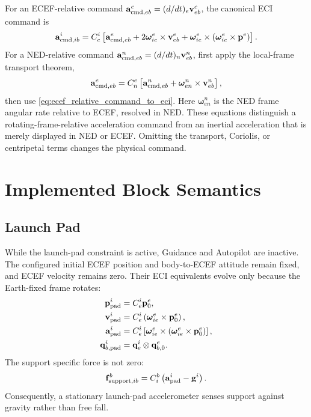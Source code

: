 For an ECEF-relative command
$\mathbf{a}_{\mathrm{cmd},eb}^{e}=(d/dt)_e\mathbf{v}_{eb}^{e}$, the canonical ECI command is
\begin{equation}
\mathbf{a}_{\mathrm{cmd},ib}^{i}
=
C_e^i
\left[
\mathbf{a}_{\mathrm{cmd},eb}^{e}
+2\boldsymbol{\omega}_{ie}^{e}\times\mathbf{v}_{eb}^{e}
+\boldsymbol{\omega}_{ie}^{e}\times
 \left(
 \boldsymbol{\omega}_{ie}^{e}\times\mathbf{p}^{e}
 \right)
\right].
\label{eq:ecef_relative_command_to_eci}
\end{equation}
For a NED-relative command
$\mathbf{a}_{\mathrm{cmd},eb}^{n}=(d/dt)_n\mathbf{v}_{eb}^{n}$, first apply the local-frame
transport theorem,
\begin{equation}
\mathbf{a}_{\mathrm{cmd},eb}^{e}
=
C_n^e
\left[
\mathbf{a}_{\mathrm{cmd},eb}^{n}
+\boldsymbol{\omega}_{en}^{n}\times\mathbf{v}_{eb}^{n}
\right],
\label{eq:ned_relative_command_to_ecef}
\end{equation}
then use \cref{eq:ecef_relative_command_to_eci}. Here
$\boldsymbol{\omega}_{en}^{n}$ is the NED frame angular rate relative to ECEF,
resolved in NED. These equations distinguish a rotating-frame-relative
acceleration command from an inertial acceleration that is merely displayed
in NED or ECEF. Omitting the transport, Coriolis, or centripetal terms changes
the physical command.

\section{Implemented Block Semantics}

\subsection{Launch Pad}

While the launch-pad constraint is active, Guidance and Autopilot are inactive.
The configured initial ECEF position and body-to-ECEF attitude remain fixed,
and ECEF velocity remains zero. Their ECI equivalents evolve only because the
Earth-fixed frame rotates:
\begin{align}
\mathbf{p}_{\mathrm{pad}}^{i}
&=C_e^i\mathbf{p}_{0}^{e},\\
\mathbf{v}_{\mathrm{pad}}^{i}
&=C_e^i
  \left(
  \boldsymbol{\omega}_{ie}^{e}\times\mathbf{p}_{0}^{e}
  \right),\\
\mathbf{a}_{\mathrm{pad}}^{i}
&=C_e^i
  \left[
  \boldsymbol{\omega}_{ie}^{e}\times
  \left(
  \boldsymbol{\omega}_{ie}^{e}\times\mathbf{p}_{0}^{e}
  \right)
  \right],\\
\mathbf{q}_{b,\mathrm{pad}}^{i}
&=\mathbf{q}_e^i\otimes\mathbf{q}_{b,0}^{e}.
\label{eq:pad_eci_state}
\end{align}
The support specific force is not zero:
\begin{equation}
\mathbf{f}_{\mathrm{support},ib}^{b}
=C_i^b
\left(
\mathbf{a}_{\mathrm{pad}}^{i}-\mathbf{g}^{i}
\right).
\label{eq:pad_support_force}
\end{equation}
Consequently, a stationary launch-pad accelerometer senses support against
gravity rather than free fall.


